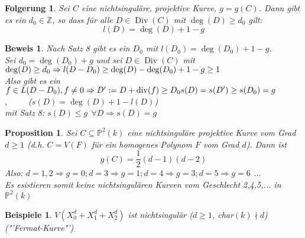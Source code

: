\documentclass[a4paper,12pt]{report}
\theoremstyle{break}
\newtheorem{Prop}[Def]{Proposition}
\newtheorem{Folg}[Def]{Folgerung}
\newtheorem{Bsp}[Def]{Beispiele}
\theoremstyle{nonumberbreak}
\theoremstyle{nonumberplain}
\newtheorem{Bew}{Beweis}
\DeclareMathOperator{\Div}{Div}
\begin{document}
\begin{Folg}
\label{folg:20.3}
Sei $C$ eine nichtsinguläre, projektive Kurve, $g=g(C)$. Dann gibt es ein $d_0\in\mathbb{Z}$, so dass für alle $D\in \Div(C)$ mit $\deg(D)\geq d_0$ gilt:
$$l(D)=\deg(D)+1-g$$
\end{Folg}

\begin{Bew}
Nach Satz 8 gibt es ein $D_0$ mit $l(D_0)=\deg(D_0)+1-g$.\\
Sei $d_0=\deg(D_0)+g$ und sei $D\in \Div(C)$ mit $\deg(D)\geq d_0\\
\Rightarrow l(D-D_0)\geq \deg(D)-\deg(D_0)+1-g\geq 1$\\
Also gibt es ein $f\in L(D-D_0), f\neq 0\\
\Rightarrow D':= D+\operatorname{div}(f)\geq D_0\\
s(D)=s(D')\geq s(D_0)=g$,~~~~~($s(D)=\deg(D)+1-l(D)$)\\
mit Satz 8: $s(D)\leq g~~\forall D\Rightarrow s(D)=g$
\end{Bew}

\begin{Prop}
\label{prop:20.4}
Sei $C\subseteq \mathbb{P}^2(k)$ eine nichtsinguläre projektive Kurve vom Grad $d\geq 1$ (d.h. $C=V(F)$ für ein homogenes Polynom $F$ vom Grad $d$). Dann ist 
$$g(C)=\frac{1}{2}(d-1)(d-2)$$
Also: $d=1,2\Rightarrow g=0; d=3\Rightarrow g=1; d=4\Rightarrow g=3; d=5\Rightarrow g=6 ~~...$\\
Es esistieren somit keine nichtsingulären Kurven vom Geschlecht 2,4,5,... in $\mathbb{P}^2(k)$
\end{Prop}

\begin{Bsp}
$V(X_0^d+X_1^d+X_2^d)$ ist nichtsingulär ($d\geq1$, char$(k)\nmid d$) ("'Fermat-Kurve"')
\end{Bsp}
\end{document}
